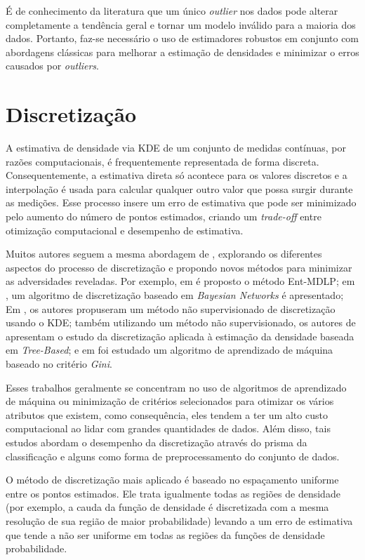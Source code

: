 É de conhecimento da literatura que um único \textit{outlier} nos dados pode alterar completamente a tendência geral e tornar um modelo inválido para a maioria dos dados. Portanto, faz-se necessário o uso de estimadores robustos em conjunto com abordagens clássicas para melhorar a estimação de densidades e minimizar o erros causados por \textit{outliers}.

\section{Discretização}

A estimativa de densidade via KDE de um conjunto de medidas contínuas, por razões computacionais, é frequentemente representada de forma discreta. Consequentemente, a estimativa direta só acontece para os valores discretos \cite{jones1989discretized} e a interpolação é usada para calcular qualquer outro valor que possa surgir durante as medições. Esse processo insere um erro de estimativa que pode ser minimizado pelo aumento do número de pontos estimados, criando um \textit{trade-off} entre otimização computacional e desempenho de estimativa.

Muitos autores seguem a mesma abordagem de \cite{jones1989discretized}, explorando os diferentes aspectos do processo de discretização e propondo novos métodos para minimizar as adversidades reveladas. Por exemplo, em \cite{fayyad1993multi} é proposto o método Ent-MDLP; em \cite{friedman1996discretizing}, um algoritmo de discretização baseado em \textit{Bayesian Networks} é apresentado; Em \cite{biba2007unsupervised}, os autores propuseram um método não supervisionado de discretização usando o KDE; também utilizando um método não supervisionado, os autores de \cite{schmidberger2005unsupervised} apresentam o estudo da discretização aplicada à estimação da densidade baseada em \textit{Tree-Based}; e em \cite{zhang2007discretization} foi estudado um algoritmo de aprendizado de máquina baseado no critério \textit{Gini}.

Esses trabalhos geralmente se concentram no uso de algoritmos de aprendizado de máquina ou minimização de critérios selecionados para otimizar os vários atributos que existem, como consequência, eles tendem a ter um alto custo computacional ao lidar com grandes quantidades de dados. Além disso, tais estudos abordam o desempenho da discretização através do prisma da classificação e alguns como forma de preprocessamento do conjunto de dados.

O método de discretização mais aplicado é baseado no espaçamento uniforme entre os pontos estimados. Ele trata igualmente todas as regiões de densidade (por exemplo, a cauda da função de densidade é discretizada com a mesma resolução de sua região de maior probabilidade) levando a um erro de estimativa que tende a não ser uniforme em todas as regiões da funções de densidade probabilidade.

